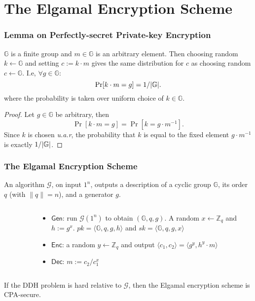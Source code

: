 \section{The Elgamal Encryption Scheme}
\begin{frame}\frametitle{Lemma on Perfectly-secret Private-key Encryption}
\begin{lemma}\label{lem:ps}
$\mathbb{G}$ is a finite group and $m\in \mathbb{G}$ is an arbitrary element. Then choosing random $k \gets \mathbb{G}$ and setting $c := k\cdot m$ gives the same distribution for $c$ as choosing random $c \gets \mathbb{G}$. I.e, $\forall g \in \mathbb{G}$:
\[ \Pr[k\cdot m = g] = 1/\lvert\mathbb{G}\rvert. \]
where the probability is taken over uniform choice of $k \in \mathbb{G}.$
\end{lemma}
\begin{proof}
Let $g \in \mathbb{G}$ be arbitrary, then
\[\Pr[k\cdot m = g] = \Pr[k = g\cdot m^{-1}]. \]
Since $k$ is chosen \emph{u.a.r}, the probability that $k$ is equal to the fixed element $g\cdot m^{-1}$ is exactly $1/\lvert\mathbb{G}\rvert$.
\end{proof}
\end{frame}
\begin{frame}\frametitle{The Elgamal Encryption Scheme}
An algorithm $\mathcal{G}$, on input $1^n$, outputs a description of a cyclic group $\mathbb{G}$, its order $q$ (with $\|q\| = n$), and a generator $g$.
\begin{columns}[]
\begin{column}{5cm}
\begin{figure}
\begin{center}

\end{center}
\end{figure}
\end{column}
\begin{column}{6cm}
\begin{construction}
\begin{itemize}
\item $\mathsf{Gen}$: run $\mathcal{G}(1^n)$ to obtain $(\mathbb{G},q,g)$. A random $x \gets \mathbb{Z}_q$ and $h := g^x$.  $pk = \langle \mathbb{G},q,g,h \rangle$ and $sk = \langle \mathbb{G},q,g,x \rangle$
\item $\mathsf{Enc}$: a random $y \gets \mathbb{Z}_q$ and output $\langle c_1, c_2 \rangle = \langle g^y, h^y\cdot m\rangle$
\item $\mathsf{Dec}$: $m:=c_2/c_1^x$
\end{itemize}
\end{construction}
\end{column}
\end{columns}
\begin{theorem}
If the DDH problem is hard relative to $\mathcal{G}$, then the Elgamal encryption scheme is CPA-secure.
\end{theorem}
\end{frame}
